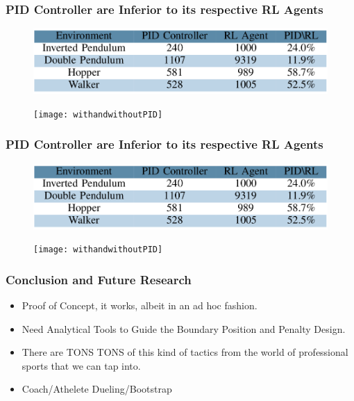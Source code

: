 \documentclass{beamer}
\begin{document}
\begin{frame}
	\frametitle{PID Controller are Inferior to its respective RL Agents}
	\begin{figure}
        \centering
	    \includegraphics[scale=0.2]{PIDvsRL}
	\end{figure}
	\begin{figure}
        \centering
	    \texttt{[image: withandwithoutPID]}
    \end{figure}
\end{frame}



\begin{frame}
	\frametitle{PID Controller are Inferior to its respective RL Agents}
	\begin{figure}
        \centering
	    \includegraphics[scale=0.2]{PIDvsRL}
	\end{figure}
	\begin{figure}
        \centering
	    \texttt{[image: withandwithoutPID]}
    \end{figure}
\end{frame}

\begin{frame}
\frametitle{Conclusion and Future Research}

	\begin{itemize}
		
		\item Proof of Concept, it works, albeit in an ad hoc fashion.

		\item Need Analytical Tools to Guide the Boundary Position and Penalty Design.

		\item There are TONS TONS of this kind of tactics from the world of professional sports that we can tap into.

		\item Coach/Athelete Dueling/Bootstrap
	\end{itemize}

\end{frame}
\end{document}
